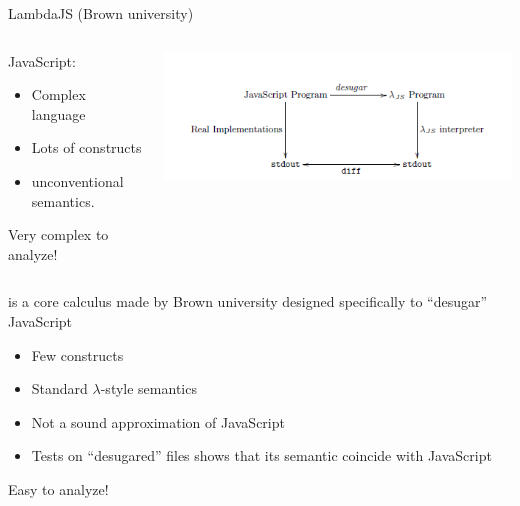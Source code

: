 \documentclass[11pt]{beamer}
\begin{document}
\begin{frame}{LambdaJS (Brown university\cite{LambdaJS})}
\begin{columns}[T]
\begin{column}{.48\textwidth}
JavaScript:
\begin{itemize}
\item Complex language
\item Lots of constructs
\item unconventional semantics.
\end{itemize}
Very complex to analyze!
\end{column}
\begin{column}{.50\textwidth}
\includegraphics[scale=0.42]{Images/LambdaJS.PNG}
\end{column}
\end{columns}\vspace{0.5cm}

\ljs\cite{LambdaJS} is a core calculus made by Brown university designed specifically to ``desugar'' JavaScript
\begin{itemize}
\item Few constructs
\item Standard $\lambda$-style semantics
\item Not a sound approximation of JavaScript
\item Tests on ``desugared'' files shows that its semantic coincide with JavaScript
\end{itemize}
Easy to analyze!
\end{frame}
\end{document}
